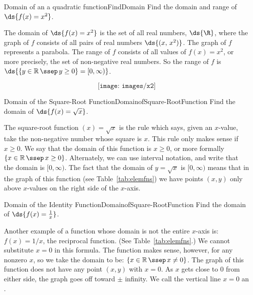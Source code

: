 \begin{example}{Domain of an a quadratic function}{FindDomain}
	Find the domain and range of $\ds{f(x)=x^{2}}$.
\end{example}

\begin{minipage}{0.6\textwidth}
	\begin{solution} 	
		The domain of $\ds{f(x)=x^{2}}$ is the set of all real numbers, $\ds{\R }$, where the graph of $f$ consists of all pairs of real numbers $\ds{(x, \,x^{2})}$. The graph of $f$ represents a parabola. The range of $f$ consists of all values of $f(x)=x^{2}$, or more precisely, the set of non-negative real numbers. So the range of $f$ is $\ds{\{y \in \mathbb{R} \, \ssep \, y \geq 0 \} = [0,\infty)}$.   \\
	\end{solution}
\end{minipage}
\begin{minipage}{0.4\textwidth}
	$$\texttt{[image: images/x2]}$$
\end{minipage}

\begin{example}{Domain of the Square-Root Function}{DomainofSquare-RootFunction}
	Find the domain of $\ds{f(x)=\sqrt{x}}$. 
\end{example}

\begin{solution}
The square-root function $(x)=\sqrt{x}$ is the rule
which says, given an $x$-value, take the non-negative number whose
square is $x$.  This rule only makes sense if $x\ge 0$. %
We say that the domain of this function is $x\ge 0$, or more formally
$\left\{x\in\mathbb{R}\, \ssep \,x\ge 0\right\}$.  Alternately, we
can use interval notation, and write that the domain is $[0,\infty)$.
The fact that the domain of $y=\sqrt{x}$ is $[0,\infty)$ means that in the
graph of this function (see Table~\ref{tab:elemfns})
we have points $(x,y)$ only above $x$-values on the right side of the
$x$-axis.
\end{solution}

\begin{example}{Domain of the Identity Function}{DomainofSquare-RootFunction}
	Find the domain of $\ds{f(x)=\frac{1}{x} }$. 
\end{example}

\begin{solution}
Another example of a function whose domain is not the entire $x$-axis
is: $f(x)=1/x$, the reciprocal function. (See Table~\ref{tab:elemfns}.)  We cannot substitute $x=0$
in this formula.  The function makes sense, however, for any nonzero
$x$, so we take the domain to be: $\{x\in\mathbb{R}\, \ssep \,x\ne 0\}$.  The graph
of this function does not have any point $(x,y)$ with $x=0$.  As $x$
gets close to 0 from either side, the graph goes off toward $\pm$ infinity.
We call the vertical line $x=0$ an .
\end{solution}


